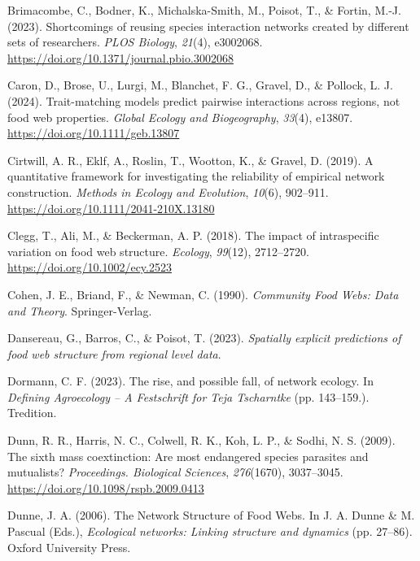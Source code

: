 \documentclass[
]{article}
\newlength{\cslhangindent}
\newenvironment{CSLReferences}[2] %
 {\begin{list}{}{%
  \setlength{\itemindent}{0pt}
  \setlength{\leftmargin}{0pt}
  \setlength{\parsep}{0pt}
  \ifodd #1
   \setlength{\leftmargin}{\cslhangindent}
   \setlength{\itemindent}{-1\cslhangindent}
  \fi
  \setlength{\itemsep}{#2\baselineskip}}}
 {\end{list}}
\begin{document}
\begin{CSLReferences}{1}{0}
Brimacombe, C., Bodner, K., Michalska-Smith, M., Poisot, T., \& Fortin,
M.-J. (2023). Shortcomings of reusing species interaction networks
created by different sets of researchers. \emph{PLOS Biology},
\emph{21}(4), e3002068.
\url{https://doi.org/10.1371/journal.pbio.3002068}

Caron, D., Brose, U., Lurgi, M., Blanchet, F. G., Gravel, D., \&
Pollock, L. J. (2024). Trait-matching models predict pairwise
interactions across regions, not food web properties. \emph{Global
Ecology and Biogeography}, \emph{33}(4), e13807.
\url{https://doi.org/10.1111/geb.13807}

Cirtwill, A. R., Eklf, A., Roslin, T., Wootton, K., \& Gravel, D.
(2019). A quantitative framework for investigating the reliability of
empirical network construction. \emph{Methods in Ecology and Evolution},
\emph{10}(6), 902--911. \url{https://doi.org/10.1111/2041-210X.13180}

Clegg, T., Ali, M., \& Beckerman, A. P. (2018). The impact of
intraspecific variation on food web structure. \emph{Ecology},
\emph{99}(12), 2712--2720. \url{https://doi.org/10.1002/ecy.2523}

Cohen, J. E., Briand, F., \& Newman, C. (1990). \emph{Community {Food
Webs}: {Data} and {Theory}}. Springer-Verlag.

Dansereau, G., Barros, C., \& Poisot, T. (2023). \emph{Spatially
explicit predictions of food web structure from regional level data}.

Dormann, C. F. (2023). The rise, and possible fall, of network ecology.
In \emph{Defining {Agroecology} -- {A Festschrift} for {Teja
Tscharntke}} (pp. 143--159.). Tredition.

Dunn, R. R., Harris, N. C., Colwell, R. K., Koh, L. P., \& Sodhi, N. S.
(2009). The sixth mass coextinction: Are most endangered species
parasites and mutualists? \emph{Proceedings. Biological Sciences},
\emph{276}(1670), 3037--3045.
\url{https://doi.org/10.1098/rspb.2009.0413}

Dunne, J. A. (2006). The {Network Structure} of {Food Webs}. In J. A.
Dunne \& M. Pascual (Eds.), \emph{Ecological networks: {Linking}
structure and dynamics} (pp. 27--86). Oxford University Press.


\end{CSLReferences}
\end{document}
